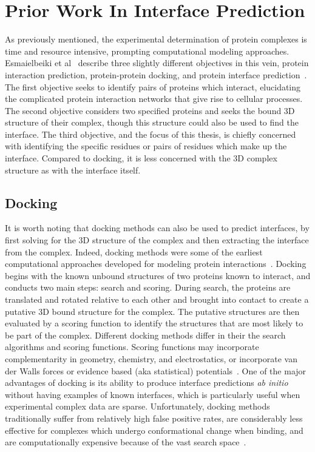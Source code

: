 
\chapter{Prior Work In Interface Prediction}
\label{chap:relatedwork} 


As previously mentioned, the experimental determination of protein complexes is time and resource intensive, prompting computational modeling approaches.
Esmaielbeiki et al~\cite{esmaielbeiki2015} describe three slightly different objectives in this vein, protein interaction prediction, protein-protein docking, and protein interface prediction~\cite{esmaielbeiki2015}.
The first objective seeks to identify pairs of proteins which interact, elucidating the complicated protein interaction networks that give rise to cellular processes. 
The second objective considers two specified proteins and seeks the bound 3D structure of their complex, though this structure could also be used to find the interface.
The third objective, and the focus of this thesis, is chiefly concerned with identifying the specific residues or pairs of residues which make up the interface.
Compared to docking, it is less concerned with the 3D complex structure as with the interface itself.

\section{Docking}

It is worth noting that docking methods can also be used to predict interfaces, by first solving for the 3D structure of the complex and then extracting the interface from the complex.
Indeed, docking methods were some of the earliest computational approaches developed for modeling protein interactions~\cite{janin1995}.
Docking begins with the known unbound structures of two proteins known to interact, and conducts two main steps: search and scoring.
During search, the proteins are translated and rotated relative to each other and brought into contact to create a putative 3D bound structure for the complex.
The putative structures are then evaluated by a scoring function to identify the structures that are most likely to be part of the complex.
Different docking methods differ in their the search algorithms and scoring functions.
Scoring functions may incorporate complementarity in geometry, chemistry, and electrostatics, or incorporate van der Walls forces or evidence based (aka statistical) potentials~\cite{tuncbag2011}\cite{janin1995}.
One of the major advantages of docking is its ability to produce interface predictions \textit{ab initio} without having examples of known interfaces, which is particularly useful when experimental complex data are sparse.
Unfortunately, docking methods traditionally suffer from relatively high false positive rates, are considerably less effective for complexes which undergo conformational change when binding, and are computationally expensive because of the vast search space~\cite{janin1995}\cite{tuncbag2011}.

